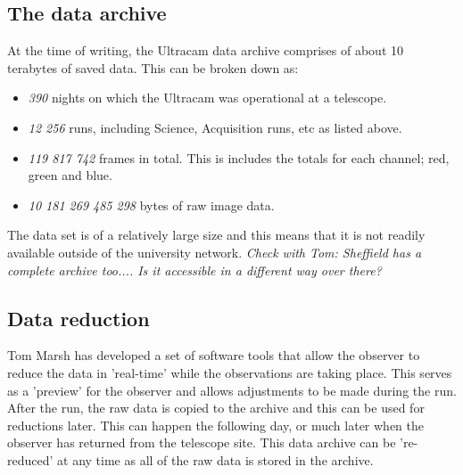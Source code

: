 \documentclass[a4paper,10pt]{article}
\begin{document}
\subsection{The data archive}
At the time of writing, the Ultracam data archive comprises of about 10 terabytes of saved data. This can be broken down as:
\begin{itemize}
	\item \emph{390} nights on which the Ultracam was operational at a telescope.
	\item \emph{12 256} runs, including Science, Acquisition runs, etc as listed above. 
	\item \emph{119 817 742} frames in total. This is includes the totals for each channel; red, green and blue.
	\item \emph{10 181 269 485 298} bytes of raw image data.
\end{itemize} 
The data set is of a relatively large size and this means that it is not readily available outside of the university network. \emph{Check with Tom: Sheffield has a complete archive too.... Is it accessible in a different way over there?} 

\subsection{Data reduction}
Tom Marsh has developed a set of software tools that allow the observer to reduce the data in 'real-time' while the observations are taking place. This serves as a 'preview' for the observer and allows adjustments to be made during the run. After the run, the raw data is copied to the archive and this can be used for reductions later. This can happen the following day, or much later when the observer has returned from the telescope site. This data archive can be 're-reduced' at any time as all of the raw data is stored in the archive. 
\end{document}
